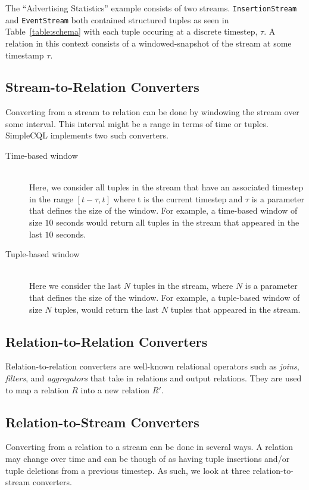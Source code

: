 \documentclass[a4paper, 10pt, conference]{IEEEconf}
\begin{document}
The ``Advertising Statistics'' example consists of two streams.  \texttt{InsertionStream} and \texttt{EventStream} both contained structured tuples as seen in Table~\ref{table:schema} with each tuple occuring at a discrete timestep, $\tau$.  A relation in this context consists of a windowed-snapshot of the stream at some timestamp $\tau$.

\subsection{Stream-to-Relation Converters}
Converting from a stream to relation can be done by windowing the stream over some interval.  This interval might be a range in terms of time or tuples.  SimpleCQL implements two such converters.

\begin{description}
  \item[Time-based window] \hfill \\
  Here, we consider all tuples in the stream that have an associated timestep in the range $[t-\tau, t]$ where t is the current timestep and $\tau$ is a parameter that defines the size of the window. For example, a time-based window of size $10$ seconds would return all tuples in the stream that appeared in the last $10$ seconds.
  
  \item[Tuple-based window] \hfill \\
  Here we consider the last $N$ tuples in the stream, where $N$ is a parameter that defines the size of the window. For example, a tuple-based window of size $N$ tuples, would return the last $N$ tuples that appeared in the stream.
\end{description}

\subsection{Relation-to-Relation Converters}

Relation-to-relation converters are well-known relational operators such as \textit{joins}, \textit{filters}, and \textit{aggregators} that take in relations and output relations. They are used to map a relation $R$ into a new relation $R'$.  

\subsection{Relation-to-Stream Converters}
Converting from a relation to a stream can be done in several ways.  A relation may change over time and can be though of as having tuple insertions and/or tuple deletions from a previous timestep.  As such, we look at three relation-to-stream converters.  
\end{document}
